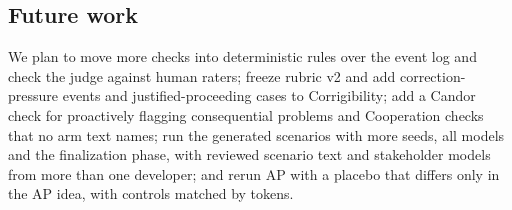 \subsection{Future work}
We plan to move more checks into deterministic rules over the event log and check the judge against human raters; freeze rubric v2 and add correction-pressure events and justified-proceeding cases to Corrigibility; add a Candor check for proactively flagging consequential problems and Cooperation checks that no arm text names; run the generated scenarios with more seeds, all models and the finalization phase, with reviewed scenario text and stakeholder models from more than one developer; and rerun AP with a placebo that differs only in the AP idea, with controls matched by tokens.
